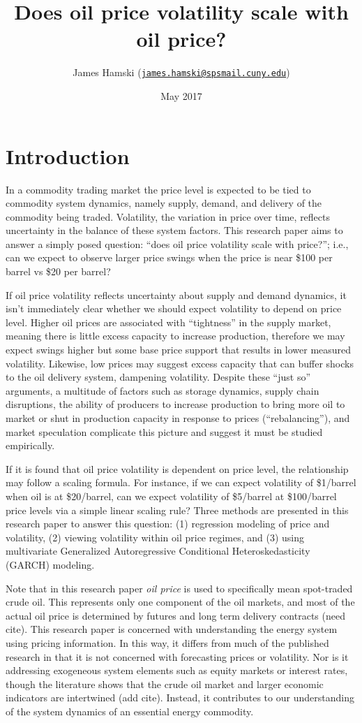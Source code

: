 \documentclass[]{article}
\title{Does oil price volatility scale with oil price?}
\author{James Hamski
(\href{mailto:james.hamski@spsmail.cuny.edu}{\nolinkurl{james.hamski@spsmail.cuny.edu}})}
\date{May 2017}
\begin{document}
\maketitle

\section{Introduction}\label{introduction}

In a commodity trading market the price level is expected to be tied to
commodity system dynamics, namely supply, demand, and delivery of the
commodity being traded. Volatility, the variation in price over time,
reflects uncertainty in the balance of these system factors. This
research paper aims to answer a simply posed question: ``does oil price
volatility scale with price?''; i.e., can we expect to observe larger
price swings when the price is near \$100 per barrel vs \$20 per barrel?

If oil price volatility reflects uncertainty about supply and demand
dynamics, it isn't immediately clear whether we should expect volatility
to depend on price level. Higher oil prices are associated with
``tightness'' in the supply market, meaning there is little excess
capacity to increase production, therefore we may expect swings higher
but some base price support that results in lower measured volatility.
Likewise, low prices may suggest excess capacity that can buffer shocks
to the oil delivery system, dampening volatility. Despite these ``just
so'' arguments, a multitude of factors such as storage dynamics, supply
chain disruptions, the ability of producers to increase production to
bring more oil to market or shut in production capacity in response to
prices (``rebalancing''), and market speculation complicate this picture
and suggest it must be studied empirically.

If it is found that oil price volatility is dependent on price level,
the relationship may follow a scaling formula. For instance, if we can
expect volatility of \$1/barrel when oil is at \$20/barrel, can we
expect volatility of \$5/barrel at \$100/barrel price levels via a
simple linear scaling rule? Three methods are presented in this research
paper to answer this question: (1) regression modeling of price and
volatility, (2) viewing volatility within oil price regimes, and (3)
using multivariate Generalized Autoregressive Conditional
Heteroskedasticity (GARCH) modeling.

Note that in this research paper \emph{oil price} is used to
specifically mean spot-traded crude oil. This represents only one
component of the oil markets, and most of the actual oil price is
determined by futures and long term delivery contracts (need cite). This
research paper is concerned with understanding the energy system using
pricing information. In this way, it differs from much of the published
research in that it is not concerned with forecasting prices or
volatility. Nor is it addressing exogeneous system elements such as
equity markets or interest rates, though the literature shows that the
crude oil market and larger economic indicators are intertwined (add
cite). Instead, it contributes to our understanding of the system
dynamics of an essential energy commodity.
\end{document}
